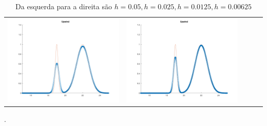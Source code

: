 \documentclass{article}
\begin{document}
\begin{table}[h]
\begin{tabular}{ccccc}
            \includegraphics[scale = 0.17]{Upwind4.png} & \includegraphics[scale = 0.17]{Upwind8.png}
        \end{tabular}
    \label{tbl:table_of_figures}
    \caption{Da esquerda para a direita são $h = 0.05, h = 0.025,h = 0.0125, h = 0.00625$}.
\end{table}
\newpage
\end{document}
